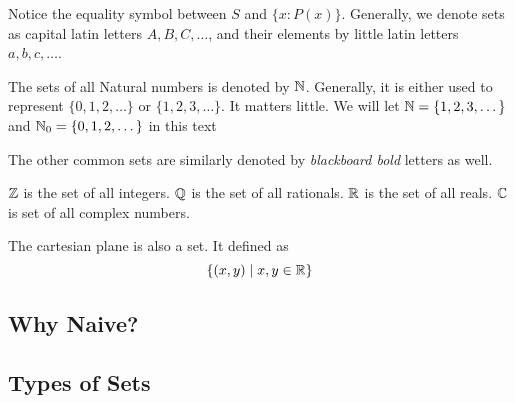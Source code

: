 \begin{remark}
    Notice the equality symbol between \(S\) and \( \{x : P(x)\} \). Generally, we denote sets
    as capital latin letters \(A, B, C, \dots\), and their elements by little latin
    letters \(a, b, c, \dots\).
\end{remark}

\begin{example}
    The sets of all Natural numbers is denoted by \(\mathbb N\). Generally, it is either used to 
    represent \( \{0, 1, 2, \dots\} \) or \( \{1, 2, 3, \dots\} \). It matters little.
    We will let \(\mathbb N = \{1, 2, 3, \dots\}\) and \(\mathbb N_0 = \{0, 1, 2, \dots\}\) in this text 
\end{example}

\begin{example}
    The other common sets are similarly denoted by \emph{blackboard bold} letters as well.
    \begin{enumerate}
        \ii \(\mathbb Z\) is the set of all integers.
        \ii \(\mathbb Q\) is the set of all rationals.
        \ii \(\mathbb R\) is the set of all reals.
        \ii \(\mathbb C\) is set of all complex numbers.
    \end{enumerate}
\end{example}


\begin{example}
    The cartesian plane is also a set. It defined as \[\{(x,y) \mid x, y \in \mathbb R\}\]
\end{example}

\subsection{Why Naive?}

\irrevl


\subsection{Types of Sets}

